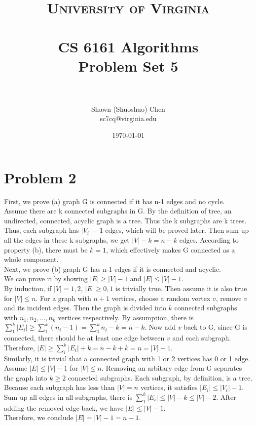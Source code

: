 \documentclass[titlepage, paper=a4, fontsize=11pt]{scrartcl} %
\title{	
\normalfont \normalsize 
\textsc{University of Virginia} \\ [25pt] %
\horrule{0.5pt} \\[0.4cm] %
\huge CS 6161 Algorithms \\
\huge Problem Set 5 \\ %
\horrule{2pt} \\[0.5cm] %
}
\author{Shawn (Shuoshuo) Chen\\sc7cq@virginia.edu} %
\date{\normalsize\today} %
\numberwithin{equation}{section} %
\numberwithin{figure}{section} %
\numberwithin{table}{section} %
\begin{document}
\maketitle %


\section*{Problem 2}
First, we prove (a) graph G is connected if it has n-1 edges and no cycle. \\
Assume there are k connected subgraphs in G. By the definition of tree, an undirected, connected, acyclic graph is a tree. Thus the k subgraphs are k trees. Thus, each subgraph has $|V_i|-1$ edges, which will be proved later. Then sum up all the edges in these k subgraphs, we get $|V|-k = n-k$ edges. According to property (b), there must be $k=1$, which effectively makes G connected as a whole component. \\

Next, we prove (b) graph G has n-1 edges if it is connected and acyclic. \\
We can prove it by showing $|E| \geq |V| -1$ and $|E| \leq |V| -1$. \\
By induction, if $|V|=1,2$, $|E| \geq 0,1$ is trivially true. Then assume it is also true for $|V| \leq n$. For a graph with $n+1$ vertices, choose a random vertex $v$, remove $v$ and its incident edges. Then the graph is divided into $k$ connected subgraphs with $n_1, n_2, ... , n_k$ vertices respectively. By assumption, there is $\sum_1^k |E_i| \geq \sum_1^k (n_i -1)=\sum_1^k n_i - k = n-k$. Now add $v$ back to G, since G is connected, there should be at least one edge between $v$ and each subgraph. Therefore,
$|E| \geq \sum_i^k |E_i| + k = n-k+k = n = |V| - 1$. \\
Similarly, it is trivial that a connected graph with 1 or 2 vertices has 0 or 1 edge. Assume $|E| \leq |V| -1$ for $|V| \leq n$. Removing an arbitary edge from G separates the graph into $k \geq 2$ connected subgraphs. Each subgraph, by definition, is a tree. Because each subgraph has less than $|V|=n$ vertices, it satisfies $|E_i| \leq |V_i| - 1$. Sum up all edges in all subgraphs, there is $\sum_1^k |E_i| \leq |V| - k \leq |V| - 2$. After adding the removed edge back, we have $|E| \leq |V| - 1$. \\
Therefore, we conclude $|E| = |V| - 1 = n-1$. \\
\end{document}
